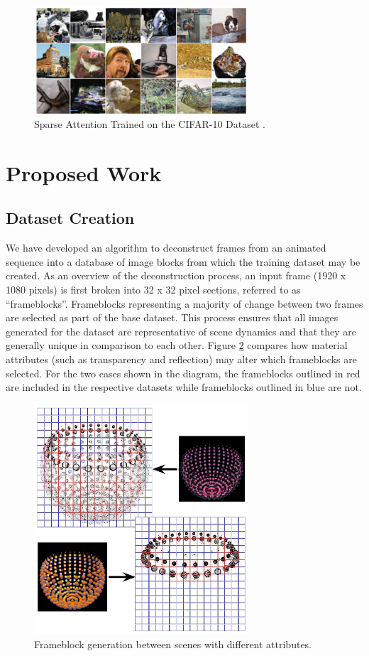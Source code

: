 \documentclass[letterpaper]{article} %
\begin{document}
\begin{figure}[htbp]
\centerline{\includegraphics[width=8cm]{sparse_attention.png}}
\caption{Sparse Attention Trained on the CIFAR-10 Dataset \cite{generative_transformers}.}
\label{fig:sparse_attention}
\end{figure}

\section{Proposed Work}
\label{sec:proposed_work}
\subsection{Dataset Creation}
\label{subsec:data}
We have developed an algorithm to deconstruct frames from an animated sequence
into a database of image blocks from which the
training dataset may be created.
As an overview of the deconstruction process,
an input frame (1920 x 1080 pixels) is first broken into
32 x 32 pixel sections, referred to as ``frameblocks''.
Frameblocks representing a majority of change between two frames
are selected as part of the base dataset.
This process ensures that all images generated for the dataset
are representative of scene dynamics and that they are generally unique
in comparison to each other.
Figure \ref{fig:frameblock_generation} compares how material attributes
(such as transparency and reflection) may alter which frameblocks are selected.
For the two cases shown in the diagram, the frameblocks outlined in red are
included in the respective datasets while frameblocks outlined in blue are not.

\begin{figure}[htbp]
\centerline{\includegraphics[width=8cm]{frameblock_generation.png}}
\caption{Frameblock generation between scenes with different attributes.}
\label{fig:frameblock_generation}
\end{figure}
\end{document}
